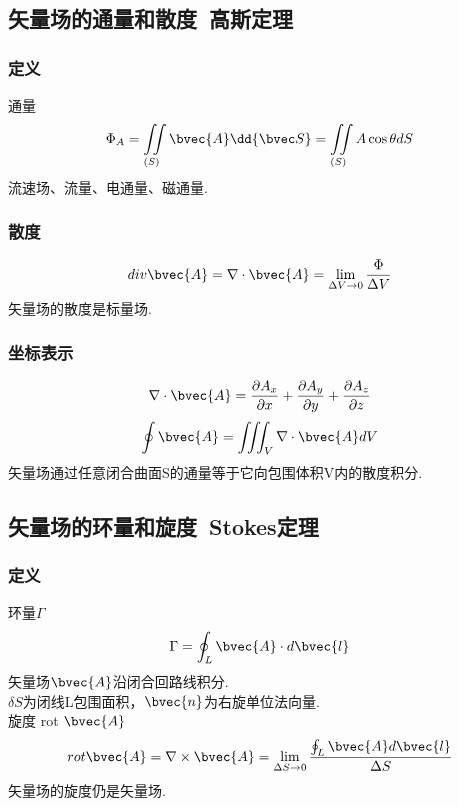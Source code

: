 \subsection{矢量场的通量和散度\ 高斯定理}%
\subsubsection{定义}
通量
\begin{equation}\label{VecAnl_eq6}
\Phi_A=\iint\limits_{(S)} \bvec{A} \dd{\bvec S} = \iint\limits_{(S)} A\cos\theta dS
\end{equation}
流速场、流量、电通量、磁通量.

\subsubsection{散度}
\begin{equation}\label{VecAnl_eq7}
div \bvec{A}=\nabla \cdot \bvec{A}=\lim_{\Delta V \to 0}\frac{\Phi}{\Delta V}
\end{equation}
矢量场的散度是标量场.

\subsubsection{坐标表示}
\begin{equation}\label{VecAnl_eq8}
\nabla \cdot \bvec{A}= \frac{\partial A_x}{\partial x}+\frac{\partial A_y}{\partial y}+\frac{\partial A_z}{\partial z}
\end{equation}
\begin{equation}\label{VecAnl_eq9}
\oint \bvec{A}=\iiint_V \nabla \cdot \bvec{A} dV
\end{equation}
矢量场通过任意闭合曲面S的通量等于它向包围体积V内的散度积分.
\subsection{矢量场的环量和旋度\ Stokes定理}%

\subsubsection{定义}
环量$\Gamma$
\begin{equation}\label{VecAnl_eq10}
\Gamma=\oint_L \bvec{A} \cdot d \bvec{l}
\end{equation}
矢量场$\bvec{A}$沿闭合回路线积分.\\
$\delta S$为闭线L包围面积，$\bvec{n}$为右旋单位法向量.\\
旋度 \qquad rot $\bvec{A}$\\
\begin{equation}\label{VecAnl_eq11}
rot \bvec{A}=\nabla \times \bvec{A}=\lim_{\Delta S \to 0} \frac{\oint_L \bvec{A} d\bvec{l}}{\Delta S}
\end{equation}
矢量场的旋度仍是矢量场.

